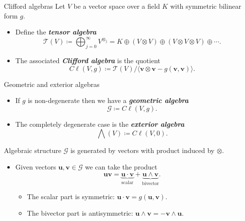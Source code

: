 \documentclass[aspectratio=169]{beamer}
\newcommand\boldgreen[1]{\textcolor{lighter_csu_green}{\emph{\textbf{#1}}}}
\newcommand{\G}{\mathcal{G}}
\newcommand{\blade}[1]{\boldsymbol{#1}}
\begin{document}
\begin{frame}{Clifford algebras}
\vfill
\pause
Let $V$ be a vector space over a field $K$ with symmetric bilinear form $g$.
\begin{itemize}
        \pause
        \item Define the \boldgreen{tensor algebra}
        \[
        \mathcal{T}(V) \coloneqq \bigoplus_{j=0}^\infty V^{\otimes_j} = K \oplus (V \otimes V) \oplus (V \otimes V \otimes V) \oplus \cdots.
        \]
        \pause
        \item The associated \boldgreen{Clifford algebra} is the quotient
        \[
        C\ell(V,g) \coloneqq \mathcal{T}(V)/ \langle \blade{v} \otimes \blade{v} - g(\blade{v},\blade{v})\rangle.
        \]
\end{itemize}
\vfill
\end{frame}

\begin{frame}{Geometric and exterior algebras}
\vfill
\begin{itemize}
        \pause
        \item If $g$ is non-degenerate then we have a \boldgreen{geometric algebra}
        \[
        \G \coloneqq C\ell(V,g).
        \]
        \pause
        \item The completely degenerate case is the \boldgreen{exterior algebra}
        \[
        \bigwedge(V) \coloneqq C\ell(V,0).
        \]
\end{itemize}
\vfill
\end{frame}

\begin{frame}{Algebraic structure}
\vfill
\pause
$\G$ is generated by vectors with product induced by $\otimes$.
\begin{itemize}
    \pause
    \item Given vectors $\blade{u}, \blade{v} \in \G$ we can take the product
    \[
    \blade{u}\blade{v} = \underbrace{\blade{u}\cdot \blade{v}}_{\textrm{scalar}} + \underbrace{\blade{u}\wedge \blade{v}}_{\textrm{bivector}}.
    \]
\begin{itemize}
    \pause
    \item The scalar part is symmetric: $\blade{u}\cdot \blade{v} = g(\blade{u},\blade{v})$.
    \pause
    \item The bivector part is antisymmetric: $\blade{u}\wedge \blade{v} = -\blade{v}\wedge \blade{u}$.
\end{itemize}
\end{itemize}
\vfill
\end{frame}
\end{document}
